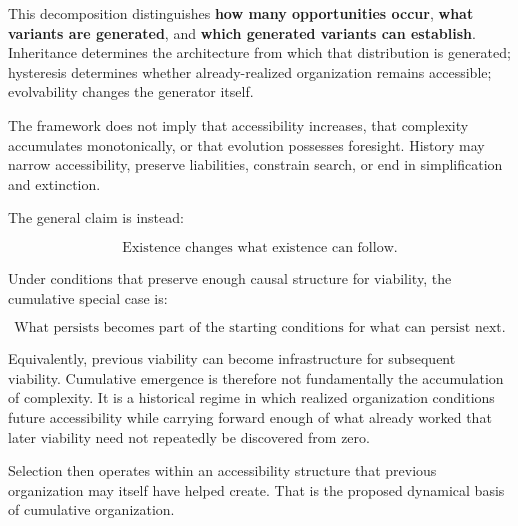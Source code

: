 \documentclass[11pt,a4paper]{article}
\begin{document}
This decomposition distinguishes \textbf{how many opportunities occur},
\textbf{what variants are generated}, and \textbf{which generated
variants can establish}. Inheritance determines the architecture from
which that distribution is generated; hysteresis determines whether
already-realized organization remains accessible; evolvability changes
the generator itself.

The framework does not imply that accessibility increases, that
complexity accumulates monotonically, or that evolution possesses
foresight. History may narrow accessibility, preserve liabilities,
constrain search, or end in simplification and extinction.

The general claim is instead:

\[
\boxed{\text{Existence changes what existence can follow.}}
\]

Under conditions that preserve enough causal structure for viability,
the cumulative special case is:

\[
\boxed{\text{What persists becomes part of the starting conditions for what can persist next.}}
\]

Equivalently, previous viability can become infrastructure for
subsequent viability. Cumulative emergence is therefore not
fundamentally the accumulation of complexity. It is a historical regime
in which realized organization conditions future accessibility while
carrying forward enough of what already worked that later viability need
not repeatedly be discovered from zero.

Selection then operates within an accessibility structure that previous
organization may itself have helped create. That is the proposed
dynamical basis of cumulative organization.


\printbibliography
\end{document}
